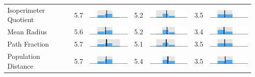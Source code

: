 \begin{table}
\begin{tabular}{l rm{7em} rm{7em} rm{7em}}
Isoperimeter Quotient  &   5.7 &       \includegraphics[width=7em]{mini_hist/MN_2008_polsby} &   5.2 &       \includegraphics[width=7em]{mini_hist/MN_2012_polsby} &   3.5 &       \includegraphics[width=7em]{mini_hist/MN_2016_polsby} \\
Mean Radius            &   5.6 &  \includegraphics[width=7em]{mini_hist/MN_2008_mean_radius} &   5.2 &  \includegraphics[width=7em]{mini_hist/MN_2012_mean_radius} &   3.4 &  \includegraphics[width=7em]{mini_hist/MN_2016_mean_radius} \\
Path Fraction          &   5.7 &    \includegraphics[width=7em]{mini_hist/MN_2008_path_frac} &   5.1 &    \includegraphics[width=7em]{mini_hist/MN_2012_path_frac} &   3.5 &    \includegraphics[width=7em]{mini_hist/MN_2016_path_frac} \\
Population Distance    &   5.7 &       \includegraphics[width=7em]{mini_hist/MN_2008_dist_p} &   5.4 &       \includegraphics[width=7em]{mini_hist/MN_2012_dist_p} &   3.5 &       \includegraphics[width=7em]{mini_hist/MN_2016_dist_p} \\

\end{tabular}
\end{table}
